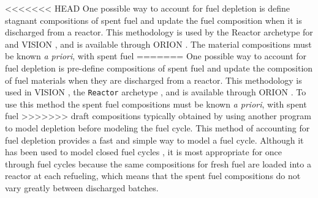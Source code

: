 <<<<<<< HEAD
One possible way to account for fuel depletion is define stagnant 
compositions of spent fuel and update the fuel composition when 
it is discharged from a reactor. This methodology is used by the 
\Cycamore Reactor archetype for \Cyclus \cite{carlsen_cycamore_2014}
and \gls{VISION} \cite{yacout_vision_2006},
and is available through ORION \cite{sunny_transition_2015}. The 
material compositions must be known \textit{a priori}, with spent fuel 
=======
One possible way to account for fuel depletion is pre-define  
compositions of spent fuel and update the composition of fuel 
materials when 
they are discharged from a reactor. This methodology is used 
in VISION \cite{yacout_vision_2006}, the \Cycamore \texttt{Reactor} 
archetype \Cyclus \cite{carlsen_cycamore_2014},
and is available through ORION \cite{sunny_transition_2015}. To 
use this method the 
spent fuel compositions must be known \textit{a priori}, with spent fuel 
>>>>>>> draft
compositions typically obtained by using another program 
to model depletion before modeling the fuel cycle. 
This method of accounting for fuel depletion provides a fast and 
simple way to model a fuel cycle. Although it has been used to 
model closed fuel cycles \cite{bae_standardized_2019,djokic_application_2015},
it is most appropriate for once through fuel cycles 
\cite{sunny_transition_2015} because the same 
compositions for fresh fuel are loaded into a reactor at each 
refueling, which means that the spent fuel compositions do not vary 
greatly between discharged batches. 

